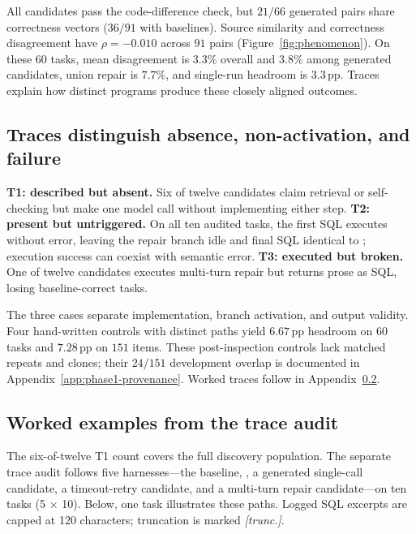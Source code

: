 All candidates pass the code-difference check, but $21/66$ generated
pairs share correctness vectors ($36/91$ with baselines).
Source similarity and correctness disagreement have
$\rho=-0.010$ across $91$ pairs (Figure~\ref{fig:phenomenon}).
On these $60$ tasks, mean disagreement is $3.3\%$ overall and
$3.8\%$ among generated candidates, union repair is $7.7\%$,
and single-run headroom is $3.3$\,pp. Traces explain how distinct
programs produce these closely aligned outcomes.

\subsection{Traces distinguish absence, non-activation, and failure}
\textbf{T1: described but absent.} Six of twelve candidates claim
retrieval or self-checking but make one model call without implementing
either step.
\textbf{T2: present but untriggered.} On all ten audited \react{} tasks,
the first SQL executes without error, leaving the repair branch idle and
final SQL identical to \bare{}; execution success can coexist with
semantic error.
\textbf{T3: executed but broken.} One of twelve candidates executes
multi-turn repair but returns prose as SQL, losing baseline-correct tasks.

The three cases separate implementation, branch activation, and output
validity. Four hand-written controls with distinct paths yield
$6.67$\,pp headroom on $60$ tasks and $7.28$\,pp on $151$ items.
These post-inspection controls lack matched repeats and clones;
their $24/151$ development overlap is documented in
Appendix~\ref{app:phase1-provenance}. Worked traces follow in
Appendix~\ref{app:examples}.

\FloatBarrier
\subsection{Worked examples from the trace audit}\label{app:examples}

The six-of-twelve T1 count covers the full discovery population.
The separate trace audit follows five harnesses---the \bare{} baseline,
\react{}, a generated single-call candidate, a timeout-retry candidate,
and a multi-turn repair candidate---on ten tasks
(5 $\times$ 10). Below, one task illustrates these paths. Logged SQL
excerpts are capped at 120 characters; truncation is marked
\emph{[trunc.]}.

